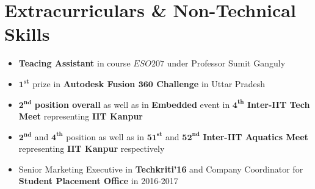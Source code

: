 \documentclass[letterpaper,11pt]{article}
\newcommand{\resumeItemS}[1]{
  \item\small{
    {#1 \vspace{-4pt}}
  }
}
\newcommand{\resumeSubItemS}[1]{\resumeItemS{#1}\vspace{-0.8pt}}
\newcommand{\resumeSubHeadingListStart}{\begin{itemize}[leftmargin=*]}
\newcommand{\resumeSubHeadingListEnd}{\end{itemize}}
\begin{document}
\section{Extracurriculars \& Non-Technical Skills}
  \resumeSubHeadingListStart
    \resumeSubItemS
      {\textbf{Teacing Assistant} in course $ESO207$ under Professor Sumit Ganguly}
    \resumeSubItemS
      {$\bm{1^{st}}$ prize in \textbf{Autodesk Fusion $\textbf{360}$ Challenge} in Uttar Pradesh}
    \resumeSubItemS
      {$\bm{2^{nd}}$ \textbf{position overall} as well as in \textbf{Embedded} event in $\bm{4^{th}}$ \textbf{Inter-IIT Tech Meet} representing \textbf{IIT Kanpur}}
    \resumeSubItemS
      {$\bm{2^{nd}}$ and $\bm{4^{th}}$ position as well as in $\bm{51^{st}}$ and $\bm{52^{nd}}$ \textbf{Inter-IIT Aquatics Meet} representing \textbf{IIT Kanpur} respectively}
    \resumeSubItemS
      {Senior Marketing Executive in \textbf{Techkriti'16} and Company Coordinator for \textbf{Student Placement Office} in 2016-2017}
  \resumeSubHeadingListEnd
\end{document}
